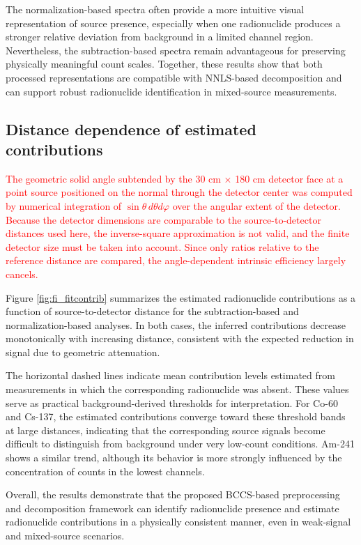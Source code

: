 \documentclass[pdflatex,sn-mathphys-num, table]{sn-jnl}%
\theoremstyle{thmstyleone}%
\theoremstyle{thmstyletwo}%
\theoremstyle{thmstylethree}%
\begin{document}
The normalization-based spectra often provide a more intuitive visual representation of source presence, especially when one radionuclide produces a stronger relative deviation from background in a limited channel region. Nevertheless, the subtraction-based spectra remain advantageous for preserving physically meaningful count scales. Together, these results
show that both processed representations are compatible with NNLS-based decomposition and can support robust radionuclide identification in mixed-source measurements.

\subsection*{Distance dependence of estimated contributions}

\textcolor{red}{The geometric solid angle subtended by the 30 cm × 180 cm detector face at a point source positioned on the normal through the detector center was computed by numerical integration of $\sin\theta \,d\theta d\varphi$ over the angular extent of the detector. Because the detector dimensions are comparable to the source-to-detector distances used here, the inverse-square approximation is not valid, and the finite detector size must be taken into account. Since only ratios relative to the reference distance are compared, the angle-dependent intrinsic efficiency largely cancels.}

Figure \ref{fig:fi_fitcontrib} summarizes the estimated radionuclide contributions as a function of source-to-detector distance for the subtraction-based and normalization-based analyses. In both cases, the inferred contributions decrease monotonically with increasing distance, consistent with the expected reduction in signal due to geometric attenuation. 

The horizontal dashed lines indicate mean contribution levels estimated from measurements in which the corresponding radionuclide was absent. These values serve as practical background-derived thresholds for interpretation. For Co-60 and Cs-137, the estimated contributions converge toward these threshold bands at large distances, indicating that the corresponding source signals become difficult to distinguish from background under very low-count conditions. Am-241 shows a similar trend, although its behavior is more strongly influenced by the concentration of counts in the lowest channels.

Overall, the results demonstrate that the proposed BCCS-based preprocessing and decomposition framework can identify radionuclide presence and estimate radionuclide contributions in a physically consistent manner, even in weak-signal and mixed-source scenarios.
\end{document}
